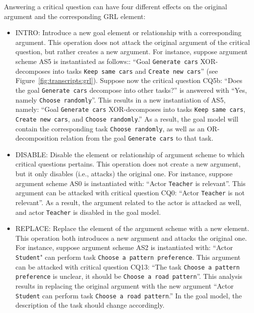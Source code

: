 Answering a critical question can have four different effects on the original argument and the corresponding GRL element:
\begin{itemize} 
\item \textsf{INTRO}: Introduce a new goal element or relationship with a corresponding argument. This operation does not attack the original argument of the critical question, but rather creates a new argument. For instance, suppose argument scheme AS5 is instantiated as follows:: ``Goal \texttt{Generate cars} XOR-decomposes into tasks \texttt{Keep same cars} and \texttt{Create new cars}'' (see Figure~\ref{fig:transcripts:grl}). 
Suppose now the critical question CQ5b: ``Does the goal \texttt{Generate cars} decompose into other tasks?'' is answered with ``Yes, namely \texttt{Choose randomly}''. This results in a new instantiation of AS5, namely: ``Goal \texttt{Generate cars} XOR-decomposes into tasks \texttt{Keep same cars}, \texttt{Create new cars}, and \texttt{Choose randomly}.'' As a result, the goal model will contain the corresponding task \texttt{Choose randomly}, as well as an OR-decomposition relation from the goal \texttt{Generate cars} to that task. %
\item \textsf{DISABLE:} Disable the element or relationship of argument scheme to which critical questions pertains. This operation does not create a new argument, but it only disables (i.e., attacks) the original one. For instance, suppose argument scheme AS0 is instantiated with: ``Actor \texttt{Teacher} is relevant''. This argument can be attacked with critical question CQ0: ``Actor \texttt{Teacher} is not relevant''. As a result, the argument related to the actor is attacked as well, and actor \texttt{Teacher} is disabled in the goal model.
\item \textsf{REPLACE:} Replace the element of the argument scheme with a new element. This operation both introduces a new argument and attacks the original one. For instance, suppose argument scheme AS2 is instantiated with: ``Actor \texttt{Student}" can perform task \texttt{Choose a pattern preference}. This argument can be attacked with critical question CQ13: ``The task \texttt{Choose a pattern preference} is unclear, it should be \texttt{Choose a road pattern}''. This analysis results in replacing the original argument with the new argument ``Actor \texttt{Student} can perform task \texttt{Choose a road pattern}.'' In the goal model, the description of the task should change accordingly.

\end{itemize}
